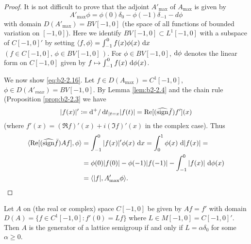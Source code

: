 \begin{proof}
It is not difficult to prove that the adjoint $A'_{\max}$ of $A_{\max}$ is given by
\begin{equation}\label{eq:b2-2.17}
A'_{\max}\phi = \phi(0)\delta_{0} - \phi(-1)\delta_{-1} - d\phi
\end{equation}
with domain $D(A'_{\max}) = BV[-1,0]$ (the space of all functions of bounded variation on $[-1,0]$).
Here we identify $BV[-1,0] \subset L^{1}[-1,0]$ with a subspace of $C[-1,0]'$ by setting $\langle f,\phi \rangle = \int_{-1}^{0} f(x)\phi(x)\,\mathop{}\!\mathrm{d}{x}$\, $(f \in C[-1,0], \,\phi \in BV[-1,0]\,)$.
For $\phi \in BV[-1,0]$,  $\mathop{}\!\mathrm{d}{\phi}$ denotes the linear form on $C[-1,0]$ given by $f \mapsto \int_{-1}^{0} f(x)\, \mathop{}\!\mathrm{d}{\phi(x)}$.

We now show \eqref{eq:b2-2.16}.
Let $f \in D(A_{\max}) = C^{1}[-1,0]$, $\phi \in D(A'_{max}) =  BV[-1,0]$.
By Lemma \ref{lem:b2-2.4} and the chain rule (Proposition \ref{prop:b2-2.3} we have
\[
|f(x)|' \coloneqq \mathop{}\!\mathrm{d}{^{+}}/\mathop{}\!\mathrm{d}{t}_{|t=x}|f(t)| = \mathop{}\!\mathrm{Re}[(\widehat{\operatorname{sign}} \bar{f})f'](x)
\]
(where $f'(x) = (\Re f)'(x) + i(\Im f)'(x)$ in the complex case).
Thus
\begin{align*}
\langle \mathop{}\!\mathrm{Re}[(\widehat{\operatorname{sign}} \bar{f})Af],\phi \rangle &= \int_{-1}^{0} |f(x)|'\phi(x)\, \mathop{}\!\mathrm{d}{x} = \int_{0}^{1} \phi(x)\, \mathop{}\!\mathrm{d}{|f(x)|} = \\
&= \phi(0)|f(0)| - \phi(-1)|f(-1)| - \int_{-1}^{0} |f(x)|\,\mathop{}\!\mathrm{d}{\phi(x)}  \\
&= \langle |f|,A'_{\max}\phi \rangle.
\end{align*}
\end{proof}
\begin{example}\label{ex:b2-2.13}
Let $A$ on (the real or complex) space $C[-1,0]$ be given by $Af = f'$ with domain $D(A) = \{f \in C^{1}[-1,0] : f'(0) = Lf\}$ where $L \in M[-1,0] = C[-1,0]'$.
Then $A$ is the generator of a lattice semigroup if and only if $L = \alpha\delta_{0}$ for some $\alpha \geq 0$.
\end{example}
